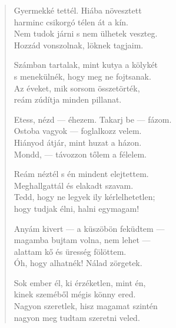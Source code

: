 \documentclass[11pt]{book}
\newcommand*{\centeredornament}{\centerline{\pgfornament[width=6cm]{88}}}
\begin{document}
\newpage

\vspace*{-15mm}
\centeredornament



\begin{verse}
  Gyermekké tettél. Hiába növesztett \\
  harminc csikorgó télen át a kín. \\
  Nem tudok járni s nem ülhetek veszteg. \\
  Hozzád vonszolnak, löknek tagjaim.

  Számban tartalak, mint kutya a kölykét \\
  s menekülnék, hogy meg ne fojtsanak. \\
  Az éveket, mik sorsom összetörték, \\
  reám zúdítja minden pillanat.

  Etess, nézd --- éhezem. Takarj be --- fázom. \\
  Ostoba vagyok --- foglalkozz velem. \\
  Hiányod átjár, mint huzat a házon. \\
  Mondd, --- távozzon tőlem a félelem.

  Reám néztél s én mindent elejtettem. \\
  Meghallgattál és elakadt szavam. \\
  Tedd, hogy ne legyek ily kérlelhetetlen; \\
  hogy tudjak élni, halni egymagam!

  Anyám kivert --- a küszöbön feküdtem --- \\
  magamba bujtam volna, nem lehet --- \\
  alattam kő és üresség fölöttem. \\
  Óh, hogy alhatnék! Nálad zörgetek.

  Sok ember él, ki érzéketlen, mint én, \\
  kinek szeméből mégis könny ered. \\
  Nagyon szeretlek, hisz magamat szintén \\
  nagyon meg tudtam szeretni veled.
\end{verse}

\newpage

\vspace*{-15mm}
\centeredornament


\end{document}
